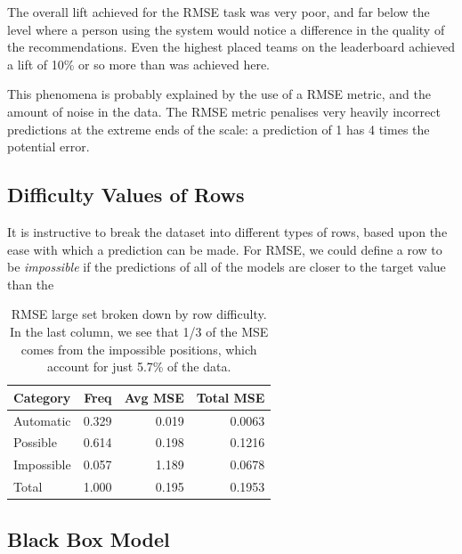 \documentclass{article}
\begin{document}
The overall lift achieved for the RMSE task was very poor, and far below the level where a person using the system would notice a difference in the quality of the recommendations.  Even the highest placed teams on the leaderboard achieved a lift of 10\% or so more than was achieved here.

This phenomena is probably explained by the use of a RMSE metric, and the amount of noise in the data.  The RMSE metric penalises very heavily incorrect predictions at the extreme ends of the scale: a prediction of 1 has 4 times the potential error.

\subsection{Difficulty Values of Rows}

It is instructive to break the dataset into different types of rows, based upon the ease with which a prediction can be made.  For RMSE, we could define a row to be \emph{impossible} if the predictions of all of the models are closer to the target value than the

\begin{table}[t]
\caption{RMSE large set broken down by row difficulty.  In the last column, we see that 1/3 of the MSE comes from the impossible positions, which account for just 5.7\% of the data.}
\label{rowtypesrmse}
\vskip 0.15in
\begin{center}
\begin{small}
\begin{sc}
\begin{tabular}{lrrr}
\hline
\abovespace\belowspace
Category & Freq & Avg MSE & Total MSE \\
\hline
\abovespace
Automatic     & 0.329 & 0.019 & 0.0063 \\
Possible      & 0.614 & 0.198 & 0.1216 \\
Impossible    & 0.057 & 1.189 & 0.0678 \\
\abovespace\belowspace
Total         & 1.000 & 0.195 & 0.1953 \\
\hline
\end{tabular}
\end{sc}
\end{small}
\end{center}
\vskip -0.1in
\end{table}




\subsection{Black Box Model}
\end{document}
